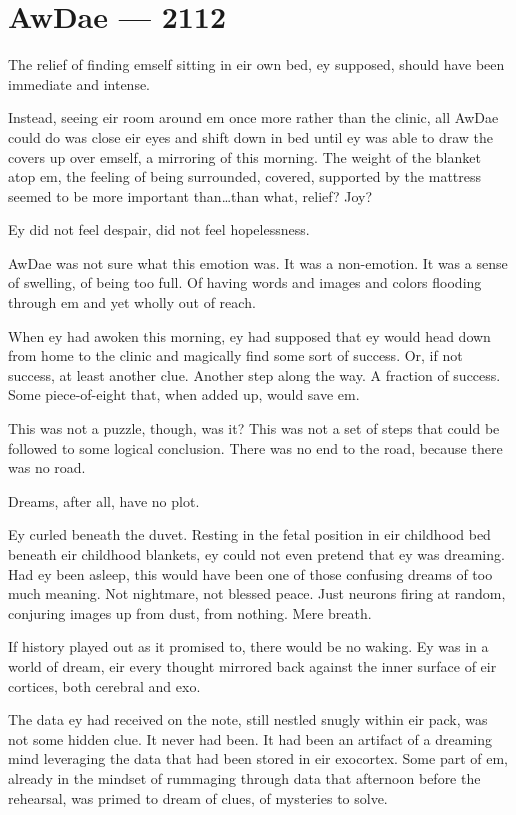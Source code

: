 \hypertarget{rj-brewster-2112}{%
\chapter*{AwDae — 2112}\label{rj-brewster-2112}}

The relief of finding emself sitting in eir own bed, ey supposed, should have been immediate and intense.

Instead, seeing eir room around em once more rather than the clinic, all AwDae could do was close eir eyes and shift down in bed until ey was able to draw the covers up over emself, a mirroring of this morning. The weight of the blanket atop em, the feeling of being surrounded, covered, supported by the mattress seemed to be more important than\ldots{}than what, relief? Joy?

Ey did not feel despair, did not feel hopelessness.

AwDae was not sure what this emotion was. It was a non-emotion. It was a sense of swelling, of being too full. Of having words and images and colors flooding through em and yet wholly out of reach.

When ey had awoken this morning, ey had supposed that ey would head down from home to the clinic and magically find some sort of success. Or, if not success, at least another clue. Another step along the way. A fraction of success. Some piece-of-eight that, when added up, would save em.

This was not a puzzle, though, was it? This was not a set of steps that could be followed to some logical conclusion. There was no end to the road, because there was no road.

Dreams, after all, have no plot.

Ey curled beneath the duvet. Resting in the fetal position in eir childhood bed beneath eir childhood blankets, ey could not even pretend that ey was dreaming. Had ey been asleep, this would have been one of those confusing dreams of too much meaning. Not nightmare, not blessed peace. Just neurons firing at random, conjuring images up from dust, from nothing. Mere breath.

If history played out as it promised to, there would be no waking. Ey was in a world of dream, eir every thought mirrored back against the inner surface of eir cortices, both cerebral and exo.

The data ey had received on the note, still nestled snugly within eir pack, was not some hidden clue. It never had been. It had been an artifact of a dreaming mind leveraging the data that had been stored in eir exocortex. Some part of em, already in the mindset of rummaging through data that afternoon before the rehearsal, was primed to dream of clues, of mysteries to solve.

